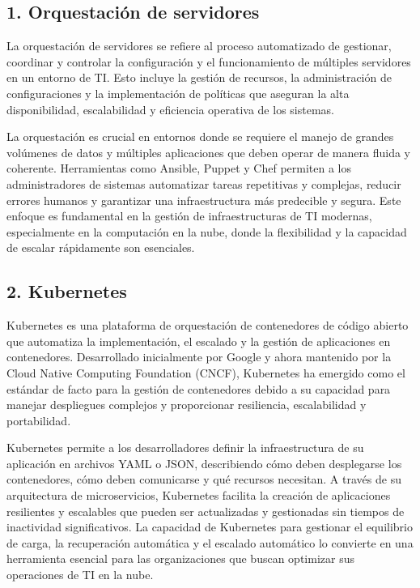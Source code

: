 \documentclass[12pt]{article}
\begin{document}
\subsection*{1. Orquestación de servidores}
La orquestación de servidores se refiere al proceso automatizado de gestionar, coordinar y controlar la configuración y el funcionamiento de múltiples servidores en un entorno de TI. Esto incluye la gestión de recursos, la administración de configuraciones y la implementación de políticas que aseguran la alta disponibilidad, escalabilidad y eficiencia operativa de los sistemas.

La orquestación es crucial en entornos donde se requiere el manejo de grandes volúmenes de datos y múltiples aplicaciones que deben operar de manera fluida y coherente. Herramientas como Ansible, Puppet y Chef permiten a los administradores de sistemas automatizar tareas repetitivas y complejas, reducir errores humanos y garantizar una infraestructura más predecible y segura. Este enfoque es fundamental en la gestión de infraestructuras de TI modernas, especialmente en la computación en la nube, donde la flexibilidad y la capacidad de escalar rápidamente son esenciales.

\subsection*{2. Kubernetes}
Kubernetes es una plataforma de orquestación de contenedores de código abierto que automatiza la implementación, el escalado y la gestión de aplicaciones en contenedores. Desarrollado inicialmente por Google y ahora mantenido por la Cloud Native Computing Foundation (CNCF), Kubernetes ha emergido como el estándar de facto para la gestión de contenedores debido a su capacidad para manejar despliegues complejos y proporcionar resiliencia, escalabilidad y portabilidad.

Kubernetes permite a los desarrolladores definir la infraestructura de su aplicación en archivos YAML o JSON, describiendo cómo deben desplegarse los contenedores, cómo deben comunicarse y qué recursos necesitan. A través de su arquitectura de microservicios, Kubernetes facilita la creación de aplicaciones resilientes y escalables que pueden ser actualizadas y gestionadas sin tiempos de inactividad significativos. La capacidad de Kubernetes para gestionar el equilibrio de carga, la recuperación automática y el escalado automático lo convierte en una herramienta esencial para las organizaciones que buscan optimizar sus operaciones de TI en la nube.
\end{document}
